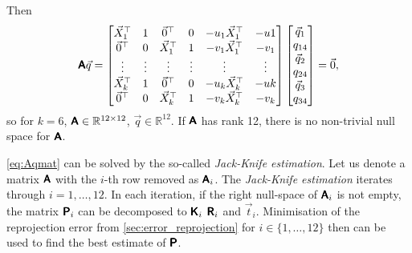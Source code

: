 Then
\begin{equation}
    \label{eq:Aqmat}
    \pmb{\mathsf{A}} \vec{q} = \begin{bmatrix}
        \vec{X}_1^\top & 1 & \vec{0}^\top & 0 & -u_1 \vec{X}_1^\top & -u1 \\
        \vec{0}^\top & 0 & \vec{X}_1^\top & 1 & -v_1 \vec{X}_1^\top & -v_1 \\ 
        \vdots & \vdots & \vdots & \vdots & \vdots & \vdots \\
        \vec{X}_k^\top & 1 & \vec{0}^\top & 0 & -u_k \vec{X}_k^\top & -uk \\
        \vec{0}^\top & 0 & \vec{X}_k^\top & 1 & -v_k \vec{X}_k^\top & -v_k \\ 
    \end{bmatrix} \begin{bmatrix}
        \vec{q}_1 \\ q_{14} \\ \vec{q}_2 \\ q_{24} \\ \vec{q}_3 \\ q_{34}
    \end{bmatrix} = \vec{0},
\end{equation}
so for $k=6$, $\pmb{\mathsf{A}} \in \mathbb{R}^{12 \times 12}$, $\vec{q} \in \mathbb{R}^{12}$. If $\pmb{\mathsf{A}}$ has rank 12, there is no non-trivial null space for $\pmb{\mathsf{A}}$.

\autoref{eq:Aqmat} can be solved by the so-called \textit{Jack-Knife estimation}. 
Let us denote a matrix $\pmb{\mathsf{A}}$ with the $i$-th row removed as $\pmb{\mathsf{A}}_i$. 
The \textit{Jack-Knife estimation} iterates through $i = 1, \dots, 12$.
In each iteration, if the right null-space of $\pmb{\mathsf{A}}_i$ is not empty, the matrix $\pmb{\mathsf{P}}_i$ can be decomposed to $\pmb{\mathsf{K}}_i$ $\pmb{\mathsf{R}}_i$ and $\vec{t}_i$.
Minimisation of the reprojection error from \autoref{sec:error_reprojection} for $i \in \{1, \dots, 12\}$ then can be used to find the best estimate of $\pmb{\mathsf{P}}$.

